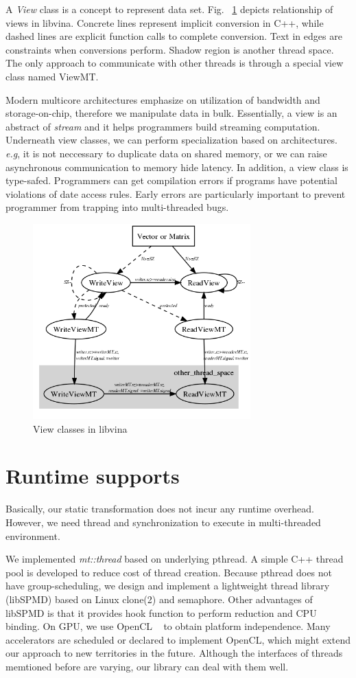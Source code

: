 \documentclass[10pt, conference, compsocconf]{IEEEtran}
\begin{document}
A \emph{View} class is a concept to represent data set.
Fig. ~\ref{fig:view} depicts relationship of views in libvina. Concrete lines
represent implicit conversion in C++, while  dashed lines are explicit
function calls to complete conversion. Text in edges are constraints
when conversions perform. Shadow region is another thread space. The
only approach to communicate with other threads is through a special view
class named ViewMT.  

Modern multicore architectures emphasize on utilization of 
bandwidth and storage-on-chip, therefore we manipulate data in
bulk. Essentially, a view is an abstract of \emph{stream} and it
helps programmers build streaming computation. Underneath view
classes, we can perform specialization based on architectures. \textit{e.g}, it is not neccessary to duplicate
data  on shared memory, or  we can raise asynchronous communication to memory
hide latency. In addition, a view class is type-safed. Programmers can get
compilation errors if programs have potential violations of date access rules. Early errors are particularly
important to prevent programmer from trapping into multi-threaded bugs.

\begin{figure}
\includegraphics[width=3.3in]{view_concept}
\caption{View classes in libvina}
\label{fig:view}
\end{figure}
\section{Runtime supports}
Basically, our static transformation does not incur any runtime
overhead. However, we need thread and synchronization to execute in
multi-threaded environment.

We implemented \emph{mt::thread} based on underlying pthread. A
simple C++ thread pool is developed to reduce cost of thread
creation. Because pthread does not have group-scheduling, we design
and implement a lightweight thread library (libSPMD) based on Linux
clone(2) and semaphore. Other advantages of libSPMD
is that it provides hook function to perform reduction and CPU binding. 
On GPU, we use OpenCL ~\cite{opencl} to obtain platform
independence. Many accelerators are scheduled or declared to
implement OpenCL, which might extend our approach to new
territories in the future.  Although the interfaces of threads
memtioned before are varying, our library can deal with them well.
\end{document}
